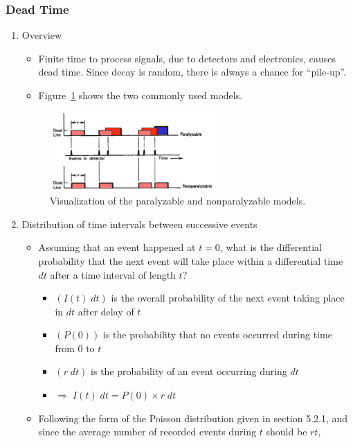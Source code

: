 \subsubsection{Dead Time}
\begin{enumerate}
    \item Overview
    \begin{itemize}
        \item Finite time to process signals, due to detectors and electronics, causes dead time. Since decay is random, there is always a chance for ``pile-up''.
        \item Figure~\ref{fig:dead_time_models} shows the two commonly used models.
    \end{itemize}
    \begin{figure}[ht]
        \centering
        \includegraphics[width=0.6\textwidth]{images/deadtimemodels.png}
        \caption{Visualization of the paralyzable and nonparalyzable models. }
        \label{fig:dead_time_models}
    \end{figure}
    \item Distribution of time intervals between 
    successive events
    \begin{itemize}
        \item Assuming that an event happened at $t=0$, what is the differential probability that the next event will take place within a differential time $dt$ after a time interval of length $t$?
        \begin{itemize}
            \item[] $(I(t)\;dt)$ is the overall probability of the next event taking place in $dt$ after delay of $t$
            \item[] $(P(0))$ is the probability that no events occurred during time from $0$ to $t$
            \item[] $(r\;dt)$ is the probability of an event occurring during $dt$
            \item[] $\Rightarrow\;I(t)\;dt=P(0)\times r\;dt$
        \end{itemize}
        \item Following the form of the Poisson distribution given in section 5.2.1, and since the average number of recorded events during $t$ should be $rt$, 

\end{itemize}
\end{enumerate}
